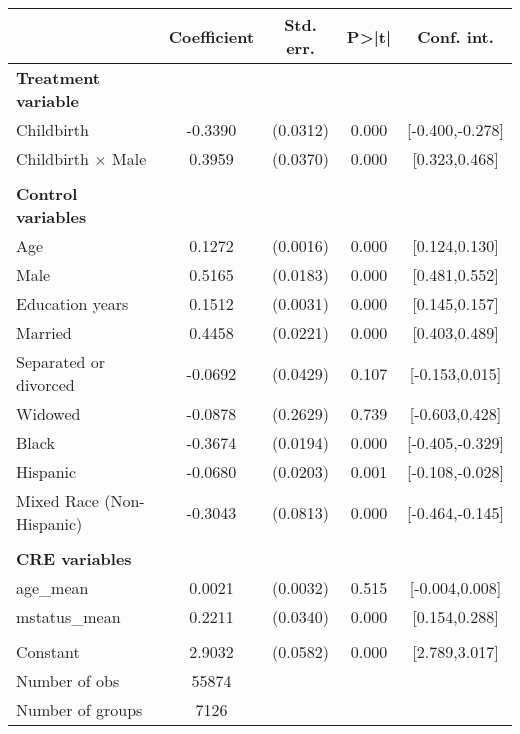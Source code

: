 {
\def\sym#1{\ifmmode^{#1}\else\(^{#1}\)\fi}
\begin{tabular}{l*{1}{cccc}}
\toprule
                    & Coefficient&   Std. err.&       P>|t|&  Conf. int.\\
\midrule
\textbf{Treatment variable}&            &            &            &            \\
Childbirth          &     -0.3390&    (0.0312)&       0.000&[-0.400,-0.278]\\
Childbirth $\times$ Male&      0.3959&    (0.0370)&       0.000&[0.323,0.468]\\
\\ \textbf{Control variables}&            &            &            &            \\
Age                 &      0.1272&    (0.0016)&       0.000&[0.124,0.130]\\
Male                &      0.5165&    (0.0183)&       0.000&[0.481,0.552]\\
Education years     &      0.1512&    (0.0031)&       0.000&[0.145,0.157]\\
Married             &      0.4458&    (0.0221)&       0.000&[0.403,0.489]\\
Separated or divorced&     -0.0692&    (0.0429)&       0.107&[-0.153,0.015]\\
Widowed             &     -0.0878&    (0.2629)&       0.739&[-0.603,0.428]\\
Black               &     -0.3674&    (0.0194)&       0.000&[-0.405,-0.329]\\
Hispanic            &     -0.0680&    (0.0203)&       0.001&[-0.108,-0.028]\\
Mixed Race (Non-Hispanic)&     -0.3043&    (0.0813)&       0.000&[-0.464,-0.145]\\
\\ \textbf{CRE variables}&            &            &            &            \\
age\_mean            &      0.0021&    (0.0032)&       0.515&[-0.004,0.008]\\
mstatus\_mean        &      0.2211&    (0.0340)&       0.000&[0.154,0.288]\\
                    &            &            &            &            \\
Constant            &      2.9032&    (0.0582)&       0.000&[2.789,3.017]\\
\midrule
Number of obs       &       55874&            &            &            \\
Number of groups    &        7126&            &            &            \\

\end{tabular}}
